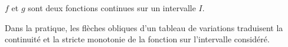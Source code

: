 \begin{bprops}
	
\(f\) et \(g\) sont deux fonctions continues sur un intervalle \(I\).

\begin{itemProp}
	\item {}\pointilles[\textwidth-0.5cm]
	\item {}\pointilles[\textwidth-0.5cm]
\end{itemProp}

\end{bprops}

\begin{brmq}
Dans la pratique, les flèches obliques d'un tableau de variations traduisent la continuité et la stricte monotonie de la fonction sur l'intervalle considéré.
\end{brmq}

